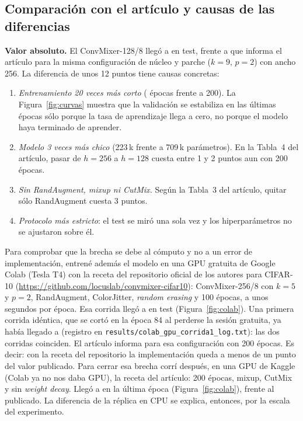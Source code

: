 \subsection{Comparación con el artículo y causas de las diferencias}

\textbf{Valor absoluto.} El ConvMixer-128/8 llegó a \pct{\accCMnueve} en test, frente a  que informa
el artículo para la misma configuración de núcleo y parche ($k=9$, $p=2$) con ancho 256. La diferencia de unos
12 puntos tiene causas concretas:
\begin{enumerate}
  \item \emph{Entrenamiento 20 veces más corto} (\epocasCNN{} épocas frente a 200). La Figura~\ref{fig:curvas}
  muestra que la validación se estabiliza en las últimas épocas sólo porque la tasa de aprendizaje llega a cero,
  no porque el modelo haya terminado de aprender.
  \item \emph{Modelo 3 veces más chico} (223\,k frente a 709\,k parámetros). En la Tabla~4 del artículo, pasar de
  $h=256$ a $h=128$ cuesta entre 1 y 2 puntos aun con 200 épocas.
  \item \emph{Sin RandAugment, mixup ni CutMix.} Según la Tabla~3 del artículo, quitar sólo RandAugment cuesta
  3 puntos.
  \item \emph{Protocolo más estricto}: el test se miró una sola vez y los hiperparámetros no se ajustaron sobre él.
\end{enumerate}

Para comprobar que la brecha se debe al cómputo y no a un error de implementación, entrené además el modelo en una
GPU gratuita de Google Colab (Tesla T4) con la receta del repositorio oficial de los autores para CIFAR-10
(\url{https://github.com/locuslab/convmixer-cifar10}): ConvMixer-256/8 con $k=5$ y $p=2$, RandAugment, ColorJitter,
\emph{random erasing} y 100 épocas, a unos \segColab{} segundos por época. Esa corrida llegó a \pct{\accColab} en test
\colabNota{} (Figura~\ref{fig:colab}). Una primera corrida idéntica, que se cortó en la época 84 al perderse la sesión gratuita, ya había llegado a  (registro en \texttt{results/colab\_gpu\_corrida1\_log.txt}): las dos corridas coinciden. El artículo informa  para esa configuración con 200 épocas. Es decir: con la receta
del repositorio la implementación queda a menos de un punto del valor publicado. Para cerrar esa brecha corrí después,
en una GPU de Kaggle (Colab ya no nos daba GPU), la receta del artículo: 200 épocas, mixup, CutMix y sin \emph{weight
decay}. Llegó a \pct{\accKaggle} en la última época (Figura~\ref{fig:colab}), frente al  publicado. La
diferencia de la réplica en CPU se explica, entonces, por la escala del experimento.

